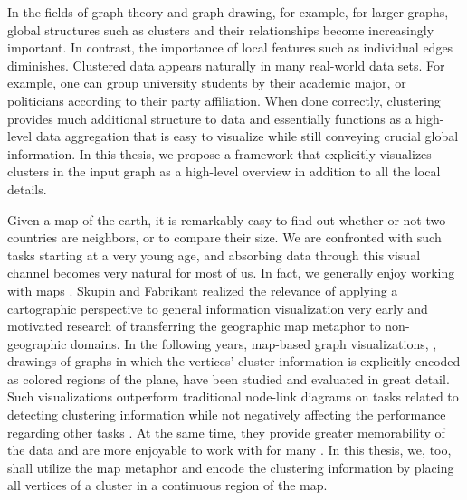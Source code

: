 \label{sect:motivation}

In the fields of graph theory and graph drawing, for example, for larger graphs, global structures such as clusters and their relationships become increasingly important.
In contrast, the importance of local features such as individual edges diminishes.
Clustered data appears naturally in many real-world data sets.
For example, one can group university students by their academic major, or politicians according to their party affiliation. 
When done correctly, clustering provides much additional structure to data and essentially functions as a high-level data aggregation that is easy to visualize while still conveying crucial global information.
In this thesis, we propose a framework that explicitly visualizes clusters in the input graph as a high-level overview in addition to all the local details.

Given a map of the earth, it is remarkably easy to find out whether or not two countries are neighbors, or to compare their size.
We are confronted with such tasks starting at a very young age, and absorbing data through this visual channel becomes very natural for most of us.
In fact, we generally enjoy working with maps \cite{saket2016comparing}.
Skupin and Fabrikant \cite{skupin2003spatialization} realized the relevance of applying a cartographic perspective to general information visualization very early and motivated research of transferring the geographic map metaphor to non-geographic domains.
In the following years, map-based graph visualizations, \ie{}, drawings of graphs in which the vertices' cluster information is explicitly encoded as colored regions of the plane, have been studied and evaluated in great detail.
Such visualizations outperform traditional node-link diagrams on tasks related to detecting clustering information while not negatively affecting the performance regarding other tasks \cite{saket2014node}. At the same time, they provide greater memorability of the data \cite{saket2015map} and are more enjoyable to work with for many \cite{saket2016comparing}.
In this thesis, we, too, shall utilize the map metaphor and encode the clustering information by placing all vertices of a cluster in a continuous region of the map.

